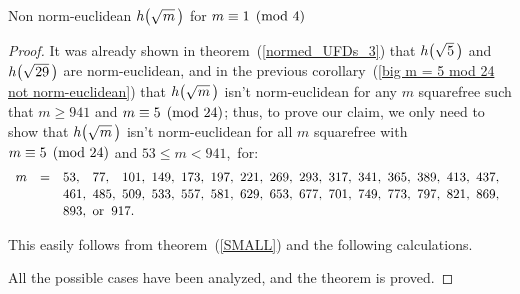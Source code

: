 \begin{subsection}{Non norm-euclidean $\hh{m}$ for $m\equiv 1 \pmod 4$}
\begin{proof}
It was already shown in theorem~(\ref{normed_UFDs_3}) that $\hh{5}$
and $\hh{29}$ are norm-euclidean, and in the previous
corollary~(\ref{big m = 5 mod 24 not norm-euclidean}) that $\hh{m}$
isn't norm-euclidean for any $m$ squarefree such that $m \geq 941$
and $m \equiv 5 \pmod{24}$; thus, to prove our claim, we only
need to show that $\hh{m}$ isn't norm-euclidean for all $m$ squarefree
with $m \equiv 5 \pmod{24}$ and $53 \leq m < 941$,\, \ie for:
\begin{displaymath}
\begin{array}{lll}
m & = &
53,\phantom{1}\ 77,\phantom{1}\ 101,\ 149,\ 173,\ 197,\ 221,\ %
269,\ 293,\ 317,\ 341,\ 365,\ 389,\ 413,\ 437,\ \\[1pt]
& &
461,\ 485,\ 509,\ 533,\ 557,\ 581,\ 629,\ 653,\ 677,\ 701,\ 749,\ %
773,\ 797,\ 821,\ 869,\ \\[1pt]
& & 893,\text{ or \:}917.
\end{array}
\end{displaymath}

This easily follows from theorem~(\ref{SMALL}) and the following
calculations.

\vspace{-3pt}


All the possible cases have been analyzed, and the
theorem is proved.

\end{proof}

\end{subsection}

